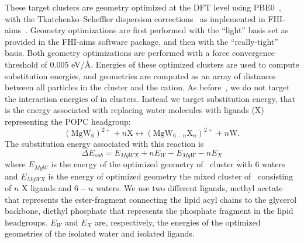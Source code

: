 These target clusters are geometry optimized at the DFT level using PBE0~\cite{adamo:1999:toward}, 
with the Tkatchenko–Scheffler 
dispersion corrections~\cite{tkatchenko:2009} as implemented in FHI-aims~\cite{fhiaims}. 
Geometry optimizations are first performed with the ``light'' basis set as provided in the 
FHI-aims software package, and then with the ``really-tight'' basis. Both
geometry optimizations are performed with a force 
convergence threshold of 0.005 eV/\AA. Energies of these optimized clusters are used to compute substitution energies, and
geometries are computed as an array of distances between all particles in the cluster and the cation.
As before~\cite{saunders:2022}, we do not target the interaction energies of \mg in clusters. Instead we target substitution energy, that is the energy associated with replacing water molecules with ligands (X) representing the POPC headgroup:
\begin{equation}
(\mathrm{Mg} \mathrm{W}_{6})^{2+} + n\mathrm{X} \longleftrightarrow (\mathrm{Mg} \mathrm{W}_{6-n} \mathrm{X}_n)^{2+} + n\mathrm{W}.
\end{equation}
The substitution energy associated with this reaction is
\begin{equation}
\Delta E_{sub} = E_{MgWX} + nE_{W} - E_{MgW} - nE_{X}
\label{equ_2}
\end{equation}
where $E_{MgW}$ is the energy of the optimized geometry of \mg~cluster with 6 waters and $E_{MgWX}$ is the energy of optimized geometry the mixed cluster of \mg~consisting of $n$ X ligands and $6-n$ waters. We use two different ligands, methyl acetate that represents the ester-fragment 
connecting the lipid acyl chains to the glycerol backbone, diethyl phosphate that represents the
phosphate fragment in the lipid headgroups. $E_{W}$ and $E_X$ are, respectively, the energies of the optimized geometries of the isolated water and isolated ligands.

